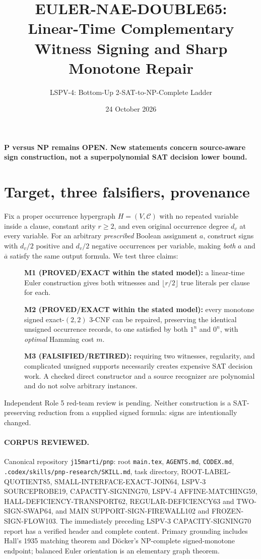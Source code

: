 \documentclass[11pt]{article}
\title{EULER-NAE-DOUBLE65:\\Linear-Time Complementary Witness Signing and Sharp Monotone Repair}
\author{LSPV-4: Bottom-Up 2-SAT-to-NP-Complete Ladder}
\date{24 October 2026}
\begin{document}
\maketitle
\begin{center}
\textbf{P versus NP remains OPEN. New statements concern source-aware sign construction, not a superpolynomial SAT decision lower bound.}
\end{center}

\section{Target, three falsifiers, provenance}
Fix a proper occurrence hypergraph \(H=(V,\mathcal C)\) with no repeated variable inside a clause, constant arity \(r\ge2\), and even original occurrence degree \(d_v\) at every variable. For an arbitrary \emph{prescribed} Boolean assignment \(a\), construct signs with \(d_v/2\) positive and \(d_v/2\) negative occurrences per variable, making \emph{both} \(a\) and \(\overline a\) satisfy the same output formula. We test three claims:
\begin{description}
\item[] \textbf{M1 (PROVED/EXACT within the stated model):} a linear-time Euler construction gives both witnesses and \(\lfloor r/2\rfloor\) true literals per clause for each.
\item[] \textbf{M2 (PROVED/EXACT within the stated model):} every monotone signed exact-$(2,2)$ 3-CNF can be repaired, preserving the identical unsigned occurrence records, to one satisfied by both \(1^n\) and \(0^n\), with \emph{optimal} Hamming cost \(m\).
\item[] \textbf{M3 (FALSIFIED/RETIRED):} requiring two witnesses, regularity, and complicated unsigned supports necessarily creates expensive SAT decision work. A checked direct constructor and a source recognizer are polynomial and do not solve arbitrary instances.
\end{description}
Independent Role 5 red-team review is pending. Neither construction is a SAT-preserving reduction from a supplied signed formula: signs are intentionally changed.

\paragraph{CORPUS REVIEWED.}
Canonical repository \texttt{j15marti/pnp}: root \texttt{main.tex}, \texttt{AGENTS.md}, \texttt{CODEX.md}, \texttt{.codex/skills/pnp-research/SKILL.md}, task directory, ROOT-LABEL-QUOTIENT85, SMALL-INTERFACE-EXACT-JOIN64, LSPV-3 SOURCEPROBE19, CAPACITY-SIGNING70, LSPV-4 AFFINE-MATCHING59, HALL-DEFICIENCY-TRANSPORT62, REGULAR-DEFICIENCY63 and TWO-SIGN-SWAP64, and MAIN SUPPORT-SIGN-FIREWALL102 and FROZEN-SIGN-FLOW103. The immediately preceding LSPV-3 CAPACITY-SIGNING70 report has a verified header and complete content. Primary grounding includes Hall's 1935 matching theorem and D\"ocker's NP-complete signed-monotone endpoint; balanced Euler orientation is an elementary graph theorem.
\end{document}
